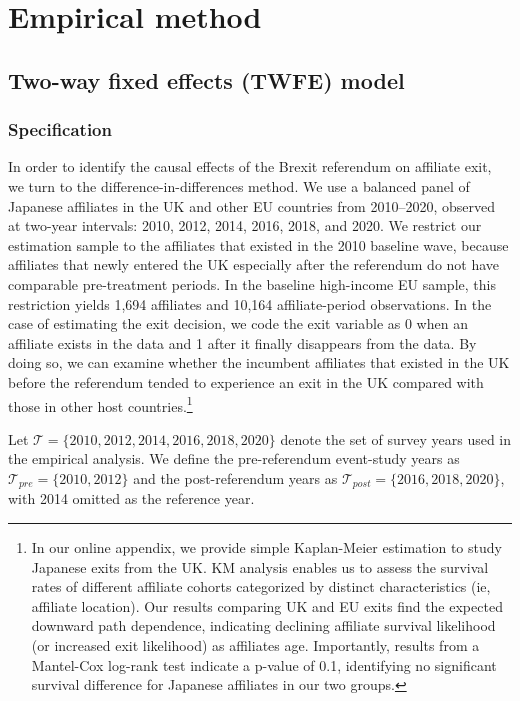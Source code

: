 \documentclass[preprint,11pt,authoryear]{elsarticle}
\begin{document}
\section{Empirical method \label{sec:method}}


\subsection{Two-way fixed effects (TWFE) model}

\subsubsection{Specification}

In order to identify the causal effects of the Brexit referendum on affiliate exit, we turn to the difference-in-differences method. We use a balanced panel of Japanese affiliates in the UK and other EU countries from 2010--2020, observed at two-year intervals: 2010, 2012, 2014, 2016, 2018, and 2020. We restrict our estimation sample to the affiliates that existed in the 2010 baseline wave, because affiliates that newly entered the UK especially after the referendum do not have comparable pre-treatment periods. In the baseline high-income EU sample, this restriction yields 1,694 affiliates and 10,164 affiliate-period observations. In the case of estimating the exit decision, we code the exit variable as 0 when an affiliate exists in the data and 1 after it finally disappears from the data. By doing so, we can examine whether the incumbent affiliates that existed in the UK before the referendum tended to experience an exit in the UK compared with those in other host countries.\footnote{In our online appendix, we provide simple Kaplan-Meier estimation to study Japanese exits from the UK. KM analysis enables us to assess the survival rates of different affiliate cohorts categorized by distinct characteristics (ie, affiliate location). Our results comparing UK and EU exits find the expected downward path dependence, indicating declining affiliate survival likelihood (or increased exit likelihood) as affiliates age. Importantly, results from a Mantel-Cox log-rank test indicate a p-value of 0.1, identifying no significant survival difference for Japanese affiliates in our two groups.}


Let $\mathcal{T}=\{2010,2012,2014,2016,2018,2020\}$ denote the set of survey years used in the empirical analysis.
We define the pre-referendum event-study years as $\mathcal{T}_{pre}=\{2010,2012\}$ and the post-referendum years as $\mathcal{T}_{post}=\{2016,2018,2020\}$, with 2014 omitted as the reference year.
\end{document}
